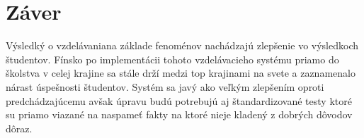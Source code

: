 \documentclass[10pt,slovak,a4paper]{article}
\begin{document}
\cite{pblf}

\section{Záver}

Výsledký o vzdelávaniana základe fenoménov nachádzajú zlepšenie vo výsledkoch študentov. Fínsko po implementácii
tohoto vzdelávacieho systému priamo do školstva v celej krajine sa stále drží medzi top krajinami na svete a zaznamenalo 
nárast úspešnosti študentov. Systém sa javý ako veľkým zlepšením oproti predchádzajúcemu avšak úpravu budú potrebujú aj
štandardizované testy ktoré su priamo viazané na naspameť fakty na ktoré nieje kladený z dobrých dôvodov dôraz.



\end{document}
